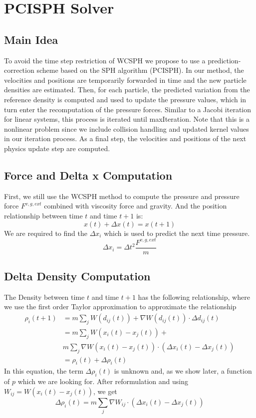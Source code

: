 \documentclass[acmtog]{acmart}
\begin{document}
\section{PCISPH Solver}
\subsection{Main Idea}
To avoid the time step restriction of WCSPH we propose to use a prediction-correction scheme based on the SPH algorithm (PCISPH). In our method, the velocities and positions are temporarily forwarded in time and the new particle densities are estimated.
Then, for each particle, the predicted variation from the reference density is computed and used to update the pressure values, which in turn enter the recomputation of the pressure forces. Similar to a Jacobi iteration for linear systems, this process is iterated until maxIteration. Note that this is a nonlinear problem since we include collision handling and updated kernel values in our iteration process. As a final step, the velocities and positions of the next physics update step are computed.

\subsection{Force and Delta x Computation}
First, we still use the WCSPH method to compute the pressure and pressure force $F^{v,g,ext}$ combined with viscosity force and gravity. And the position relationship between time $t$ and time $t+1$ is:
$$
 x(t)+\Delta x(t)=x(t+1)
$$
We are required to find the $\Delta x_i$ which is used to predict the next time pressure.
$$
\Delta x_i = \Delta t^2\frac{F^{v,g,ext}}{m}
$$


\subsection{Delta Density Computation}
The Density between time $t$ and time $t+1$ has the following relationship, where we use the first order Taylor approximation to approximate the relationship
\begin{equation*}
	\begin{aligned}
		\rho_i(t+1)&=m\sum_j W(d_{ij}(t))+\nabla W(d_{ij}(t))\cdot \Delta d_{ij}(t)\\
		&=m\sum_j W(x_i(t)-x_j(t))+\\
		&m\sum_j \nabla W(x_i(t)-x_j(t))\cdot(\Delta x_i(t)-\Delta x_j(t))\\
		&=\rho_i(t)+\Delta \rho_i(t)
	\end{aligned}
\end{equation*}
\newline
In this equation, the term $\Delta \rho_i(t)$ is unknown and, as we show later, a function of $p$ which we are looking for. After reformulation and using $W_{ij}= W(x_i(t)-x_j(t))$, we get
\begin{equation*}
	\Delta \rho_i(t)=m\sum_j \nabla W_{ij}\cdot(\Delta x_i(t)-\Delta x_j(t))
\end{equation*}
\end{document}
